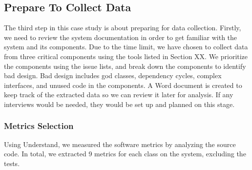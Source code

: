 \subsection{Prepare To Collect Data}
The third step in this case study is about preparing for data collection. Firstly, we need to review the system documentation in order to get familiar with the system and its components. Due to the time limit, we have chosen to collect data from three critical components using the tools listed in Section XX. We prioritize the components using the issue lists, and break down the components to identify bad design. Bad design includes god classes, dependency cycles, complex interfaces, and unused code in the components. A Word document is created to keep track of the extracted data so we can review it later for analysis. If any interviews would be needed, they would be set up and planned on this stage. 


\subsubsection{Metrics Selection}
Using Understand, we measured the software metrics by analyzing the source code. In total, we extracted 9 metrics for each class on the system, excluding the tests.

